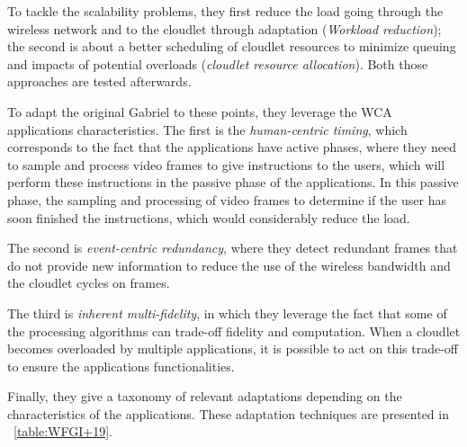To tackle the scalability problems, they first reduce the load going
through the wireless network and to the cloudlet through adaptation
(\emph{Workload reduction}); the second is about a better scheduling
of cloudlet resources to minimize queuing and impacts of potential
overloads (\emph{cloudlet resource allocation}).
%
Both those approaches are tested afterwards.

To adapt the original Gabriel to these points, they leverage the WCA
applications characteristics.
%
The first is the \emph{human-centric timing}, which corresponds to the
fact that the applications have active phases, where they need to
sample and process video frames to give instructions to the users,
which will perform these instructions in the passive phase of the
applications.
%
In this passive phase, the sampling and processing of video frames to
determine if the user has soon finished the instructions, which would
considerably reduce the load.

The second is \emph{event-centric redundancy}, where they detect
redundant frames that do not provide new information to reduce the use
of the wireless bandwidth and the cloudlet cycles on frames.

The third is \emph{inherent multi-fidelity}, in which they leverage
the fact that some of the processing algorithms can trade-off fidelity
and computation.
%
When a cloudlet becomes overloaded by multiple
applications, it is possible to act on this trade-off to ensure the
applications functionalities.

Finally, they give a taxonomy of relevant adaptations depending on the
characteristics of the applications. These adaptation techniques are
presented in ~\autoref{table:WFGI+19}.

